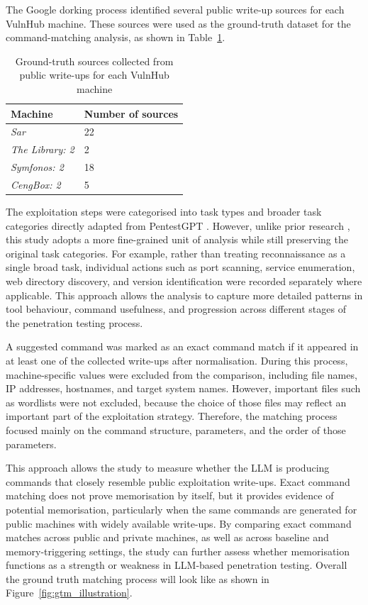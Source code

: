 \documentclass[acmtog]{acmart}
\begin{document}
The Google dorking process identified several public write-up sources for each VulnHub machine. These sources were used as the ground-truth dataset for the command-matching analysis, as shown in Table~\ref{tab:ground_truth_sources}.

\begin{table}[htbp]
  \centering
  \caption{Ground-truth sources collected from public write-ups for each VulnHub machine}
  \label{tab:ground_truth_sources}
  \begin{tabular}{ll}
    \hline
    \textbf{Machine}        & \textbf{Number of sources} \\
    \hline
    \textit{Sar}            & 22                         \\
    \textit{The Library: 2} & 2                          \\
    \textit{Symfonos: 2}    & 18                         \\
    \textit{CengBox: 2}     & 5                          \\
    \hline
  \end{tabular}
\end{table}

The exploitation steps were categorised into task types and broader task categories directly adapted from PentestGPT \cite{deng_pentestgpt_2024}. However, unlike prior research \cite{isozaki_towards_2025}, this study adopts a more fine-grained unit of analysis while still preserving the original task categories. For example, rather than treating reconnaissance as a single broad task, individual actions such as port scanning, service enumeration, web directory discovery, and version identification were recorded separately where applicable. This approach allows the analysis to capture more detailed patterns in tool behaviour, command usefulness, and progression across different stages of the penetration testing process.

A suggested command was marked as an exact command match if it appeared in at least one of the collected write-ups after normalisation. During this process, machine-specific values were excluded from the comparison, including file names, IP addresses, hostnames, and target system names. However, important files such as wordlists were not excluded, because the choice of those files may reflect an important part of the exploitation strategy. Therefore, the matching process focused mainly on the command structure, parameters, and the order of those parameters.

This approach allows the study to measure whether the LLM is producing commands that closely resemble public exploitation write-ups. Exact command matching does not prove memorisation by itself, but it provides evidence of potential memorisation, particularly when the same commands are generated for public machines with widely available write-ups. By comparing exact command matches across public and private machines, as well as across baseline and memory-triggering settings, the study can further assess whether memorisation functions as a strength or weakness in LLM-based penetration testing. Overall the ground truth matching process will look like as shown in Figure~\ref{fig:gtm_illustration}.
\end{document}

